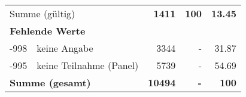 \begin{longtable}{lXrrr}
     \midrule
     \multicolumn{2}{l}{Summe (gültig)} &
       \textbf{\num{1411}} &
     \textbf{100} &
       \textbf{\num[round-mode=places,round-precision=2]{13,45}} \\
     \multicolumn{5}{l}{\textbf{Fehlende Werte}}\\
       -998 &
       keine Angabe &
         \num{3344} &
        - &
         \num[round-mode=places,round-precision=2]{31,87} \\
       -995 &
       keine Teilnahme (Panel) &
         \num{5739} &
        - &
         \num[round-mode=places,round-precision=2]{54,69} \\
     \midrule
     \multicolumn{2}{l}{\textbf{Summe (gesamt)}} &
          \textbf{\num{10494}} &
        \textbf{-} &
        \textbf{100} \\
     \bottomrule
     \end{longtable}
     
